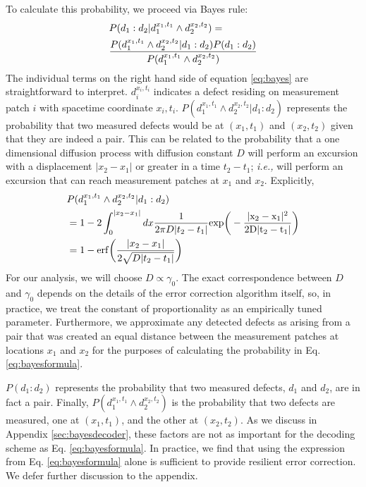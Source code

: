 \documentclass[twocolumn,superscriptaddress,aps,prb,floatfix]{revtex4-1}
\begin{document}
To calculate this probability, we proceed via Bayes rule: 
\begin{align}
\label{eq:bayes}
&P(d_1:d_2 | d_1^{x_1,t_1} \wedge d_2^{x_2,t_2}) = \\ \notag
&\frac{P(d_1^{x_1,t_1} \wedge d_2^{x_2,t_2} | d_1:d_2) P(d_1 : d_2)}{P(d_1^{x_1,t_1}\wedge d_2^{x_2,t_2})}
\end{align}
The individual terms on the right hand side of equation \ref{eq:bayes} are straightforward to interpret.  $d_i^{x_i,t_i}$ indicates a defect residing on measurement patch $i$ with spacetime coordinate $x_i,t_i$.  $P(d_1^{x_1,t_1} \wedge d_2^{x_2,t_2} | d_1:d_2)$ represents the probability that two measured defects would be at $(x_1,t_1)$ and $(x_2,t_2)$ given that they are indeed a pair.  This can be related to the probability that a one dimensional diffusion process with diffusion constant $D$ will perform an excursion with a displacement $|x_2-x_1|$ or greater in a time $t_2 - t_1$; \textit{i.e.,} will perform an excursion that can reach measurement patches at $x_1$ and $x_2$. Explicitly,
\begin{align}
\label{eq:bayesformula}
&P(d_1^{x_1,t_1} \wedge d_2^{x_2,t_2} | d_1:d_2) \\ \notag
&= 1-2\int_{0}^{|x_2-x_1|} dx \frac{1}{2\pi D |t_2-t_1|} \rm{exp}\bigg(-\frac{|x_2-x_1|^2}{2 D |t_2-t_1|}\bigg) \\ \notag 
&= 1 - {\rm erf}\bigg(\frac{|x_2-x_1|}{2\sqrt{D |t_2 - t_1|}}\bigg) 
\end{align}
For our analysis, we will choose $D\propto \gamma_0$.  The exact correspondence between $D$ and $\gamma_0$ depends on the details of the error correction algorithm itself, so, in practice, we treat the constant of proportionality as an empirically tuned parameter.  Furthermore, we approximate any detected defects as arising from a pair that was created an equal distance between the measurement patches at locations $x_1$ and $x_2$ for the purposes of calculating the probability in Eq. \ref{eq:bayesformula}.

$P(d_1 : d_2)$ represents the probability that two measured defects, $d_1$ and $d_2$, are in fact a pair.  Finally, $P(d_1^{x_1,t_1}\wedge d_2^{x_2,t_2})$ is the probability that two defects are measured, one at $(x_1,t_1)$, and the other at $(x_2,t_2)$.  As we discuss in Appendix \ref{sec:bayesdecoder}, these factors are not as important for the decoding scheme as Eq. \ref{eq:bayesformula}.  In practice, we find that using the expression from Eq. \ref{eq:bayesformula} alone is sufficient to provide resilient error correction.  We defer further discussion to the appendix.
 
\end{document}

